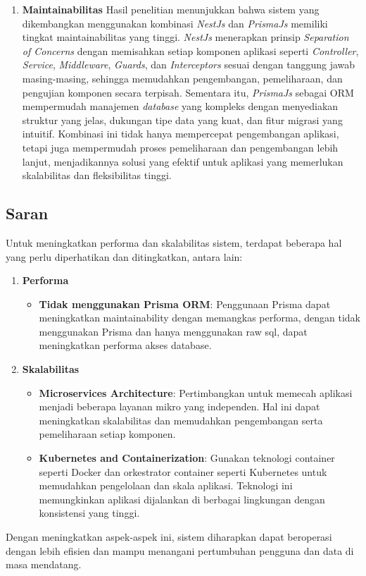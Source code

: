 \begin{enumerate}
  \item \textbf{Maintainabilitas}\newline
  Hasil penelitian menunjukkan bahwa sistem yang dikembangkan menggunakan kombinasi \textit{NestJs} dan \textit{PrismaJs} memiliki tingkat maintainabilitas yang tinggi. \textit{NestJs} menerapkan prinsip \textit{Separation of Concerns} dengan memisahkan setiap komponen aplikasi seperti \textit{Controller}, \textit{Service}, \textit{Middleware}, \textit{Guards}, dan \textit{Interceptors} sesuai dengan tanggung jawab masing-masing, sehingga memudahkan pengembangan, pemeliharaan, dan pengujian komponen secara terpisah. Sementara itu, \textit{PrismaJs} sebagai ORM mempermudah manajemen \textit{database} yang kompleks dengan menyediakan struktur yang jelas, dukungan tipe data yang kuat, dan fitur migrasi yang intuitif. Kombinasi ini tidak hanya mempercepat pengembangan aplikasi, tetapi juga mempermudah proses pemeliharaan dan pengembangan lebih lanjut, menjadikannya solusi yang efektif untuk aplikasi yang memerlukan skalabilitas dan fleksibilitas tinggi.

\end{enumerate}
\newpage

\subsection{Saran}
Untuk meningkatkan performa dan skalabilitas sistem, terdapat beberapa hal yang perlu diperhatikan dan ditingkatkan, antara lain:
\begin{enumerate}
  \item \textbf{Performa} \newline
  \begin{itemize}
    \item \textbf{Tidak menggunakan Prisma ORM}: Penggunaan Prisma dapat meningkatkan maintainability dengan memangkas performa, dengan tidak menggunakan Prisma dan hanya menggunakan raw sql, dapat meningkatkan performa akses database.
  \end{itemize}
  \item \textbf{Skalabilitas} \newline
  \begin{itemize}
    \item \textbf{Microservices Architecture}: Pertimbangkan untuk memecah aplikasi menjadi beberapa layanan mikro yang independen. Hal ini dapat meningkatkan skalabilitas dan memudahkan pengembangan serta pemeliharaan setiap komponen.
    \item \textbf{Kubernetes and Containerization}: Gunakan teknologi container seperti Docker dan orkestrator container seperti Kubernetes untuk memudahkan pengelolaan dan skala aplikasi. Teknologi ini memungkinkan aplikasi dijalankan di berbagai lingkungan dengan konsistensi yang tinggi.
  \end{itemize}
\end{enumerate}
Dengan meningkatkan aspek-aspek ini, sistem diharapkan dapat beroperasi dengan lebih efisien dan mampu menangani pertumbuhan pengguna dan data di masa mendatang.

